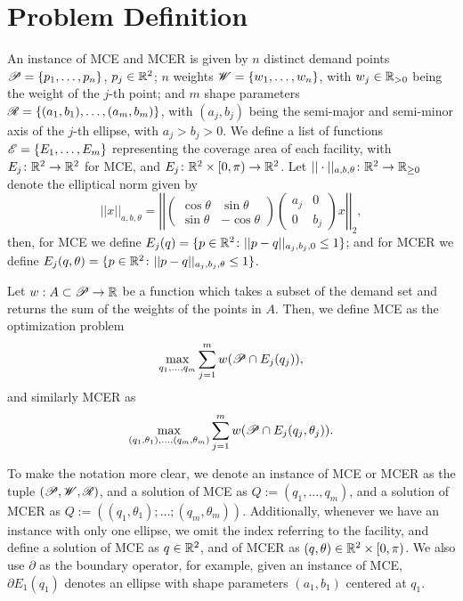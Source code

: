 	\section{Problem Definition}
	
	An instance of MCE and MCER is given by $n$ distinct demand points $\mathscr{P}=\{p_1, \dots, p_n\}$, $p_j\in\mathbb{R}^2$; $n$ weights $\mathscr{W}=\{w_1, \dots, w_n\}$, with $w_j\in\mathbb{R}_{>0}$ being the weight of the $j$-th point; and $m$ shape parameters $\mathscr{R}=\{(a_1, b_1), \dots, (a_m, b_m)\}$, with $(a_j, b_j)$ being the semi-major and semi-minor axis of the $j$-th ellipse, with $a_j > b_j > 0$. We define a list of functions $\mathscr{E}=\{E_1, \dots, E_m\}$ representing the coverage area of each facility, with $E_j \colon \mathbb{R}^2 \to \mathbb{R}^2$ for MCE, and $E_j \colon \mathbb{R}^2\times [0, \pi)\to \mathbb{R}^2$. Let $||\cdot||_{a,b, \theta} \colon \mathbb{R}^2 \to \mathbb{R}_{\ge0}$ denote the elliptical norm given by
	\begin{equation*}
	||x||_{a,b, \theta}=\left|\left|
	\left(\begin{array}{rr}
	\cos{\theta} & \sin{\theta}\\
	\sin{\theta} & -\cos{\theta}
	\end{array}
	\right)
	\left(\begin{array}{cc}
	a_j & 0\\
	0 & b_j
	\end{array}\right) x \right|\right|_2,
	\end{equation*}
	then, for MCE we define $E_j(q)=\{p \in \mathbb{R}^2 \colon ||p-q||_{a_j,b_j,0} \le 1\}$; and for MCER we define $E_j(q, \theta)=\{p \in \mathbb{R}^2 \colon ||p-q||_{a_j,b_j, \theta} \le 1\}$.
	
Let $w : A \subset \mathscr{P} \to \mathbb{R}$ be a function which takes a subset of the demand set and returns the sum of the weights of the points in $A$. Then, we define MCE as the optimization problem 
\begin{equation*}
\max_{q_1, \dots, q_m} \sum_{j=1}^m w(\mathscr{P} \cap E_j(q_j)),
\end{equation*}
and similarly MCER as
\begin{equation*}
\max_{(q_1, \theta_1), \dots, (q_m, \theta_m)} \sum_{j=1}^m w(\mathscr{P} \cap E_j(q_j, \theta_j)).
\end{equation*}

To make the notation more clear, we denote an instance of MCE or MCER as the tuple $(\mathscr{P}, \mathscr{W}, \mathscr{R})$, and a solution of MCE as $Q:=(q_1, \dots, q_m)$, and a solution of MCER as $Q:=((q_1, \theta_1); \dots; (q_m, \theta_m))$. Additionally, whenever we have an instance with only one ellipse, we omit the index referring to the facility, and define a solution of MCE as $q\in\mathbb{R}^2$, and of MCER as $(q, \theta) \in \mathbb{R}^2\times [0, \pi)$.
We also use $\partial$ as the boundary operator, for example, given an instance of MCE, $\partial E_1(q_1)$ denotes an ellipse with shape parameters $(a_1, b_1)$ centered at $q_1$.

